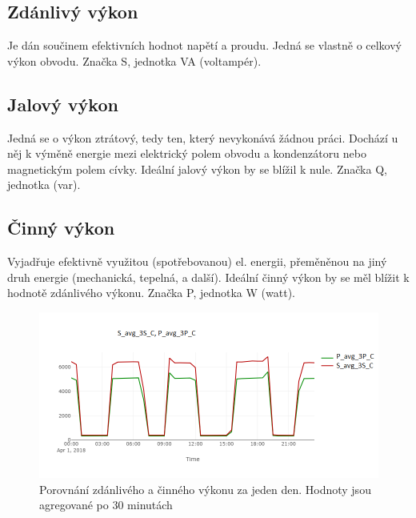 \documentclass[FM,BP]{tulthesis}
\begin{document}
        \subsection*{Zdánlivý výkon}
            Je dán součinem efektivních hodnot napětí a proudu. 
            Jedná se vlastně o celkový výkon obvodu. Značka S, jednotka VA (voltampér). 
        \subsection*{Jalový výkon}
            Jedná se o výkon ztrátový, tedy ten, který nevykonává žádnou práci. 
            Dochází u něj k výměně energie mezi elektrický polem obvodu a kondenzátoru nebo magnetickým polem cívky. 
            Ideální jalový výkon by se blížil k nule. Značka Q, jednotka (var).
        \subsection*{Činný výkon}
            Vyjadřuje efektivně využitou (spotřebovanou) el. energii, přeměněnou na jiný druh energie (mechanická, tepelná, a další). 
            Ideální činný výkon by se měl blížit k hodnotě zdánlivého výkonu. Značka P, jednotka W (watt). \cite{32}
        \begin{figure}[h]
            \centering
            \includegraphics[scale=0.7]{pic/SP.png}
            \caption{Porovnání zdánlivého a činného výkonu za jeden den. Hodnoty jsou agregované po 30 minutách} \label{Obrázek č. 8}
        \end{figure}
        
\end{document}
